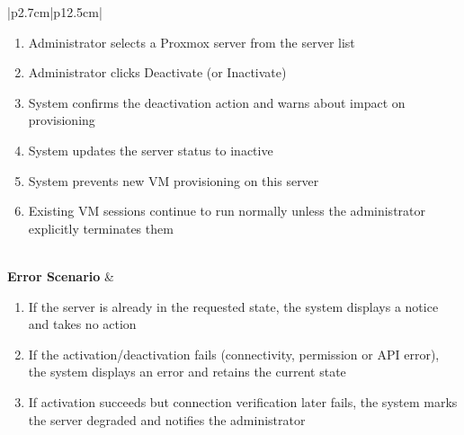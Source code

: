\begin{table}[H]
\begin{tabular}{|p{2.7cm}|p{12.5cm}|}
\begin{minipage}[t]{\linewidth}
                                      \begin{enumerate}[topsep=0pt,itemsep=1pt,parsep=0pt,partopsep=0pt]
                                          \item Administrator selects a Proxmox server from the server list
                                          \item Administrator clicks Deactivate (or Inactivate)
                                          \item System confirms the deactivation action and warns about impact on provisioning
                                          \item System updates the server status to inactive
                                          \item System prevents new VM provisioning on this server
                                          \item Existing VM sessions continue to run normally unless the administrator explicitly terminates them
                                      \end{enumerate}
                                  \end{minipage}                                     \\
        \hline
        \textbf{Error Scenario} & \begin{minipage}[t]{\linewidth}
                                      \begin{enumerate}[topsep=0pt,itemsep=1pt,parsep=0pt,partopsep=0pt]
                                          \item If the server is already in the requested state, the system displays a notice and takes no action
                                          \item If the activation/deactivation fails (connectivity, permission or API error), the system displays an error and retains the current state
                                          \item If activation succeeds but connection verification later fails, the system marks the server degraded and notifies the administrator
                                      \end{enumerate}
                                  \end{minipage}                 \\
        \hline
    \end{tabular}
    \label{tab:admin-activate-deactivate-server}
\end{table}
